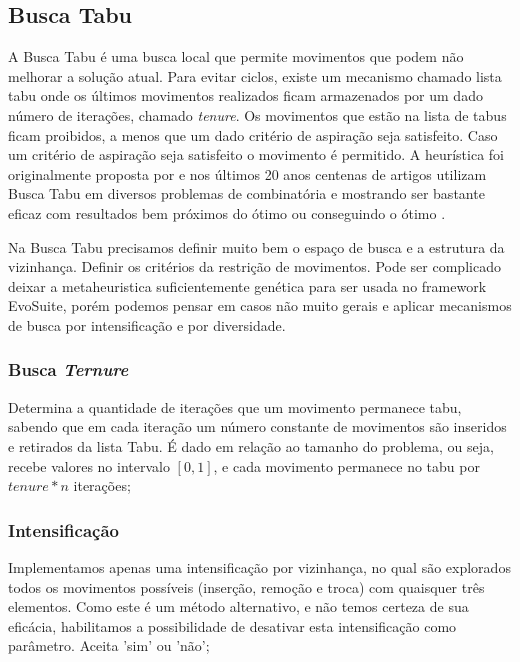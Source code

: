 \documentclass[12pt,a4paper]{article}
\begin{document}
\subsection{Busca Tabu}

A Busca Tabu é uma busca local que permite movimentos que podem não melhorar a solução atual. Para evitar ciclos, existe um mecanismo chamado lista tabu onde os últimos movimentos realizados
ficam armazenados por um dado número de iterações, chamado \textit{tenure}. Os movimentos que estão na lista de tabus ficam proibidos, a menos que um dado critério de aspiração seja
satisfeito. Caso um critério de aspiração seja satisfeito o movimento é permitido. A heurística foi originalmente proposta por \citeauthor{glover1986future} \cite{glover1986future} e nos
últimos 20 anos centenas de artigos utilizam Busca Tabu em diversos problemas de combinatória e mostrando ser bastante eficaz com resultados bem próximos do ótimo ou conseguindo o ótimo
\cite{gendreau2010handbook}.

Na Busca Tabu precisamos definir muito bem o espaço de busca e a estrutura da vizinhança. Definir os critérios da restrição de movimentos. Pode ser complicado deixar a metaheuristica
suficientemente genética para ser usada no framework EvoSuite, porém podemos pensar em casos não muito gerais e aplicar mecanismos de busca por intensificação e por diversidade.

    \subsubsection{Busca \textit{Ternure}}

        Determina a quantidade de iterações que um movimento permanece tabu, sabendo que em cada iteração um número constante de movimentos são inseridos e retirados da lista
        Tabu. É dado em relação ao tamanho do problema, ou seja, recebe valores no intervalo $[0,1]$, e cada movimento permanece no tabu por $\textit{tenure}*n$ iterações;


    \subsubsection{Intensificação}

        Implementamos apenas uma intensificação por vizinhança, no qual são explorados todos os movimentos possíveis (inserção, remoção e troca) com quaisquer três elementos. Como
        este é um método alternativo, e não temos certeza de sua eficácia, habilitamos a possibilidade de desativar esta intensificação como parâmetro. Aceita 'sim' ou 'não';
\end{document}
